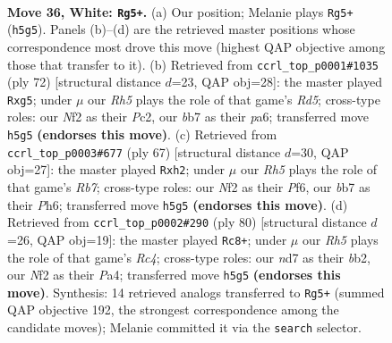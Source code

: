 \documentclass[11pt]{article}
\begin{document}
\clearpage

\begin{figure}[p]\centering
\begin{subfigure}{0.46\textwidth}\centering
\resizebox{\linewidth}{!}{%
\newchessgame
\chessboard[
  setfen={5r2/1b1n2k1/8/3p3R/p7/P5P1/1PP2N2/2K5 w - - 6 36},
  showmover=false,
  pgfstyle=straightmove, color=movearrow, markmove={h5-g5}
]}
\caption{}
\end{subfigure}\hfill
\begin{subfigure}{0.46\textwidth}\centering
\resizebox{\linewidth}{!}{%
\newchessgame
\chessboard[
  setfen={4n1k1/6p1/p5N1/3R2p1/2r5/6P1/2P2PK1/8 w - - 1 37},
  showmover=false,
  pgfstyle=straightmove, color=movearrow, markmove={d5-g5}
]}
\caption{}
\end{subfigure}
\\[4pt]
\begin{subfigure}{0.46\textwidth}\centering
\resizebox{\linewidth}{!}{%
\newchessgame
\chessboard[
  setfen={6k1/6p1/3R1p1p/8/p7/P3KPP1/1r5P/8 b - - 1 34},
  showmover=false,
  pgfstyle=straightmove, color=movearrow, markmove={b2-h2}
]}
\caption{}
\end{subfigure}\hfill
\begin{subfigure}{0.46\textwidth}\centering
\resizebox{\linewidth}{!}{%
\newchessgame
\chessboard[
  setfen={5k2/p4p2/4p3/1P4P1/P1R5/r4N2/1b4K1/8 w - - 1 41},
  showmover=false,
  pgfstyle=straightmove, color=movearrow, markmove={c4-c8}
]}
\caption{}
\end{subfigure}
\caption{\textbf{Move 36, White: \texttt{Rg5+}.} (a) Our position; Melanie plays \texttt{Rg5+} (\texttt{h5g5}). Panels (b)--(d) are the retrieved master positions whose correspondence most drove this move (highest QAP objective among those that transfer to it). (b) Retrieved from \texttt{ccrl\_top\_p0001\#1035} (ply 72) [structural distance $d$=23, QAP obj=28]: the master played \texttt{Rxg5}; under $\mu$ our \emph{Rh5} plays the role of that game's \emph{Rd5}; cross-type roles: our \emph{N}f2 as their \emph{P}c2, our \emph{b}b7 as their \emph{p}a6; transferred move \texttt{h5g5} \textbf{(endorses this move)}. (c) Retrieved from \texttt{ccrl\_top\_p0003\#677} (ply 67) [structural distance $d$=30, QAP obj=27]: the master played \texttt{Rxh2}; under $\mu$ our \emph{Rh5} plays the role of that game's \emph{Rb7}; cross-type roles: our \emph{N}f2 as their \emph{P}f6, our \emph{b}b7 as their \emph{P}h6; transferred move \texttt{h5g5} \textbf{(endorses this move)}. (d) Retrieved from \texttt{ccrl\_top\_p0002\#290} (ply 80) [structural distance $d$=26, QAP obj=19]: the master played \texttt{Rc8+}; under $\mu$ our \emph{Rh5} plays the role of that game's \emph{Rc4}; cross-type roles: our \emph{n}d7 as their \emph{b}b2, our \emph{N}f2 as their \emph{P}a4; transferred move \texttt{h5g5} \textbf{(endorses this move)}. Synthesis: 14 retrieved analogs transferred to \texttt{Rg5+} (summed QAP objective 192, the strongest correspondence among the candidate moves); Melanie committed it via the \texttt{search} selector.}
\label{fig:thought-m70}
\end{figure}
\end{document}
